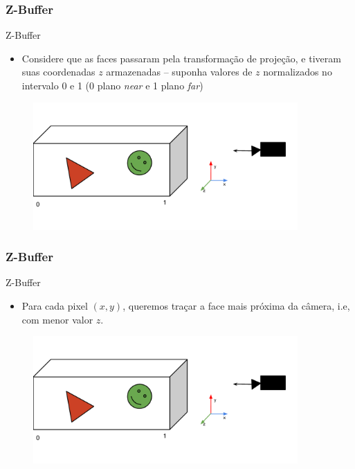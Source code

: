 \documentclass{beamer}
\begin{document}
\begin{frame}
\frametitle{Z-Buffer}

		\begin{block}{Z-Buffer}
			\begin{itemize}	
				\item Considere que as faces passaram pela transformação de projeção, e tiveram suas coordenadas $z$ armazenadas -- suponha valores de $z$ normalizados no intervalo 0 e 1 (0 plano \textit{near} e 1 plano \textit{far})
			\end{itemize}
		\end{block}

		\begin{figure}[!h]
			\begin{center}
				\includegraphics[width=0.9\textwidth]{Figures/ProCam}
			\end{center}
		\end{figure}		
		
\end{frame}


\begin{frame}
\frametitle{Z-Buffer}

		\begin{block}{Z-Buffer}
			\begin{itemize}	
				\item Para cada pixel $(x,y)$, queremos traçar a face mais próxima da câmera, i.e, com menor valor $z$.
			\end{itemize}
		\end{block}

		\begin{figure}[!h]
			\begin{center}
				\includegraphics[width=0.9\textwidth]{Figures/ProCam}
			\end{center}
		\end{figure}		
		
\end{frame}
\end{document}
